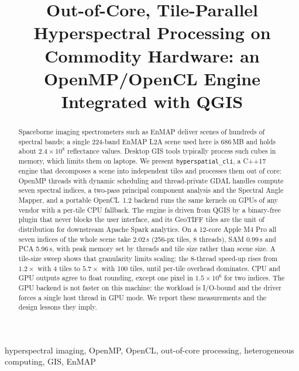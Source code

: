 \documentclass[conference]{IEEEtran}
\begin{document}
\title{Out-of-Core, Tile-Parallel Hyperspectral Processing on Commodity
Hardware: an OpenMP/OpenCL Engine Integrated with QGIS}

\author{
}

\maketitle

\begin{abstract}
Spaceborne imaging spectrometers such as EnMAP deliver scenes of hundreds of
spectral bands; a single 224-band EnMAP L2A scene used here is 686\,MB and
holds about $2.4\times10^{8}$ reflectance values. Desktop GIS tools typically
process such cubes in memory, which limits them on laptops. We present
\texttt{hyperspatial\_cli}, a C++17 engine that decomposes a scene into
independent tiles and processes them out of core: OpenMP threads with
dynamic scheduling and thread-private GDAL handles compute seven spectral
indices, a two-pass principal component analysis and the Spectral Angle
Mapper, and a portable OpenCL~1.2 backend runs the same kernels on GPUs of any
vendor with a per-tile CPU fallback. The engine is driven from QGIS by a
binary-free plugin that never blocks the user interface, and its GeoTIFF tiles
are the unit of distribution for downstream Apache Spark analytics. On a
12-core Apple M4 Pro all seven indices of the whole scene take 2.02\,s
(256-px tiles, 8 threads), SAM 0.99\,s and PCA 5.96\,s, with peak memory set
by threads and tile size rather than scene size. A tile-size sweep shows that
granularity limits scaling: the 8-thread speed-up rises from $1.2\times$ with
4 tiles to $5.7\times$ with 100 tiles, until per-tile overhead dominates.
CPU and GPU outputs agree to float rounding, except one pixel in
$1.5\times10^{6}$ for two indices. The GPU backend is not faster on this
machine: the workload is I/O-bound and the driver forces a single host
thread in GPU mode. We report these measurements and the design lessons they
imply.
\end{abstract}

\begin{IEEEkeywords}
hyperspectral imaging, OpenMP, OpenCL, out-of-core processing,
heterogeneous computing, GIS, EnMAP
\end{IEEEkeywords}
\end{document}
